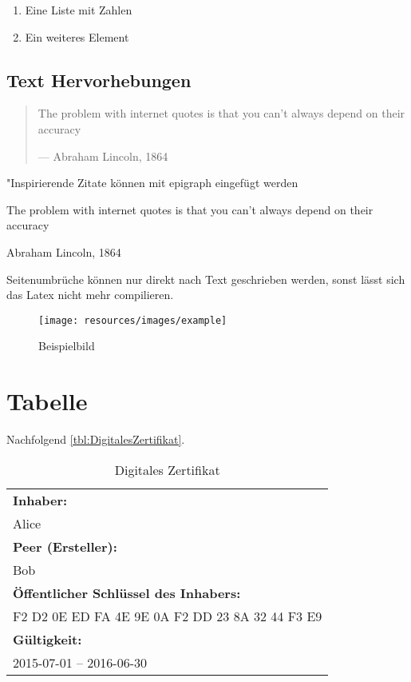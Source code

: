 \documentclass[chapterprefix=true, 12pt, a4paper, oneside, parskip=half, listof=totoc, bibliography=totoc, numbers=noendperiod]{scrbook}
\begin{document}
\begin{enumerate}
	\item Eine Liste mit Zahlen
	\item Ein weiteres Element
\end{enumerate}

\subsection{Text Hervorhebungen}
\begin{quote}
	The problem with internet quotes is that you can't always depend on their accuracy \par\raggedleft--- \textup{Abraham Lincoln, 1864}
\end{quote}

"Inspirierende Zitate können mit epigraph eingefügt werden
\epigraph{The problem with internet quotes is that you can't always depend on their accuracy}{Abraham Lincoln, 1864}

Seitenumbrüche können nur direkt nach Text geschrieben werden, sonst lässt sich das Latex nicht mehr compilieren.
\\

\begin{figure}[H]
	\centering
	\texttt{[image: resources/images/example]}
	\caption{Beispielbild {\cite{PEXELS2015}}}
	\label{img:beispielbild}
\end{figure}

\section{Tabelle}

Nachfolgend \autoref{tbl:DigitalesZertifikat}.

\begin{table}[H]
	\begin{center}
		\renewcommand{\arraystretch}{1.3}
		\begin{tabular}{|l|}
			\hline
			\textbf{Inhaber:}\\
			Alice \\ \hline
			\textbf{Peer (Ersteller):}\\
			Bob \\ \hline
			\textbf{Öffentlicher Schlüssel des Inhabers:}\\
			F2 D2 0E ED FA 4E 9E 0A F2 DD 23 8A 32 44 F3 E9 \\ \hline
			\textbf{Gültigkeit:}\\
			2015-07-01 – 2016-06-30 \\ \hline
		\end{tabular}
	\end{center}
	\caption{Digitales Zertifikat}
	\label{tbl:DigitalesZertifikat}
\end{table}
\end{document}
